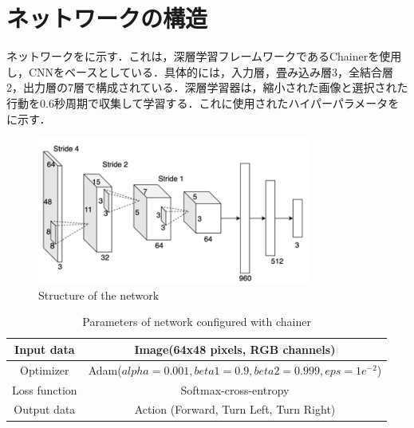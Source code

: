 
\section{ネットワークの構造}

  ネットワークをに示す．これは，深層学習フレームワークであるChainer\cite{chainer}を使用し，CNNをベースとしている．具体的には，入力層，畳み込み層3，全結合層2，出力層の7層で構成されている．深層学習器は，縮小された画像と選択された行動を0.6秒周期で収集して学習する．これに使用されたハイパーパラメータをに示す．

  \begin{figure}[h]
    \centering
    \includegraphics[keepaspectratio, scale=0.70] {images/okada_network.png}
    \caption{Structure of the network \cite{okada}}
    \label{Fig:okada_network}
  \end{figure}

  \begin{table}[hbtp]
    \caption{Parameters of network configured with chainer}
    \label{tab:Parameters of network configured with chainer}
    \centering
    \begin{tabular}{|c|c|}
      \hline
      Input data & Image(64x48 pixels, RGB channels) \\
      \hline
      Optimizer & Adam($alpha = 0.001, beta1 = 0.9, beta2 =  0.999, eps = 1e^{-2}$)\\
      \hline
      Loss function & Softmax-cross-entropy\\
      \hline
      Output data & Action (Forward, Turn Left, Turn Right)\\
      \hline
    \end{tabular}
  \end{table}

\newpage